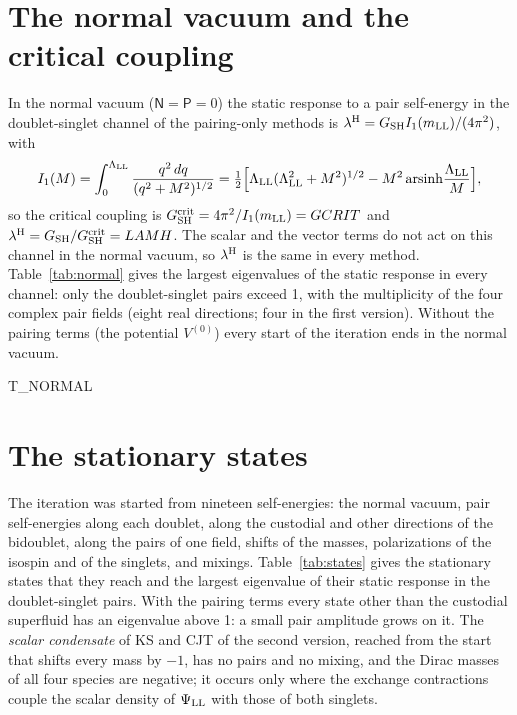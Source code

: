 \documentclass[aps,prd,onecolumn,superscriptaddress,nofootinbib,floatfix,longbibliography]{revtex4-2}
\newcommand{\LL}{{\rm LL}}
\newcommand{\SH}{{\rm SH}}
\begin{document}
\section{The normal vacuum and the critical coupling}
\label{sec:normal}

In the normal vacuum ($\mathsf N=\mathsf P=0$) the static response to a pair self-energy in the doublet-singlet channel of
the pairing-only methods is $\lambda^{\rm H}=G_\SH I_1(m_\LL)/(4\pi^2)$, with
\begin{equation}
I_1(M)=\int_0^{\Lambda_\LL}\frac{q^2\,dq}{(q^2+M^2)^{1/2}}=\tfrac12\Big[\Lambda_\LL(\Lambda_\LL^2+M^2)^{1/2}-M^2\,{\rm arsinh}\frac{\Lambda_\LL}{M}\Big],
\label{eq:I1}
\end{equation}
so the critical coupling is $G^{\rm crit}_\SH=4\pi^2/I_1(m_\LL)={{GCRIT}}$ and $\lambda^{\rm H}=G_\SH/G^{\rm crit}_\SH={{LAMH}}$.
The scalar and the vector terms do not act on this channel in the normal vacuum, so $\lambda^{\rm H}$ is the same in every
method. Table~\ref{tab:normal} gives the largest eigenvalues of the static response in every channel: only the
doublet-singlet pairs exceed 1, with the multiplicity of the four complex pair fields (eight real directions; four in the
first version). Without the pairing terms (the potential $V^{(0)}$) every start of the iteration ends in the normal vacuum.

{{T_NORMAL}}

\section{The stationary states}
\label{sec:states}

The iteration was started from nineteen self-energies: the normal vacuum, pair self-energies along each doublet, along
the custodial and other directions of the bidoublet, along the pairs of one field, shifts of the masses, polarizations of
the isospin and of the singlets, and mixings. Table~\ref{tab:states} gives the stationary states that they reach and the
largest eigenvalue of their static response in the doublet-singlet pairs. With the pairing terms every state other than
the custodial superfluid has an eigenvalue above 1: a small pair amplitude grows on it. The \emph{scalar condensate} of
KS and CJT of the second version, reached from the start that shifts every mass by $-1$, has no pairs and no mixing, and
the Dirac masses of all four species are negative; it occurs only where the exchange contractions couple the scalar
density of $\Psi_\LL$ with those of both singlets.
\end{document}
